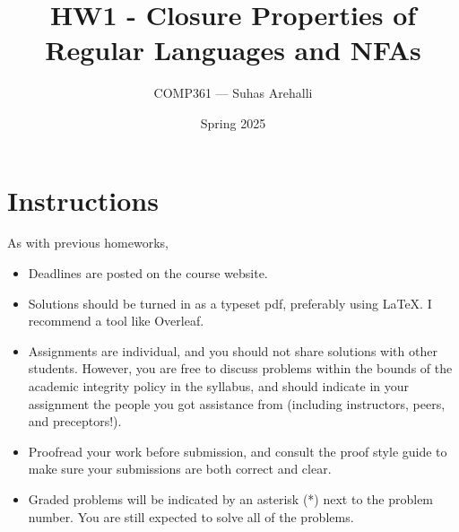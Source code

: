 \documentclass{exam}
\title{HW1 - Closure Properties of Regular Languages and NFAs}
\author{COMP361 --- Suhas Arehalli}
\date{Spring 2025}
\begin{document}
\maketitle

\section*{Instructions}
As with previous homeworks, 

\begin{itemize}
    \item Deadlines are posted on the course website.
    \item Solutions should be turned in as a typeset pdf, preferably using LaTeX. I recommend a tool like Overleaf. 
    \item Assignments are individual, and you should not share solutions with other students. However, you are free to discuss problems within the bounds of the academic integrity policy in the syllabus, and should indicate in your assignment the people you got assistance from (including instructors, peers, and preceptors!). 
    \item Proofread your work before submission, and consult the proof style guide to make sure your submissions are both correct and clear.
    \item Graded problems will be indicated by an asterisk (*) next to the problem number. You are still expected to solve all of the problems.
\end{itemize}
\end{document}
